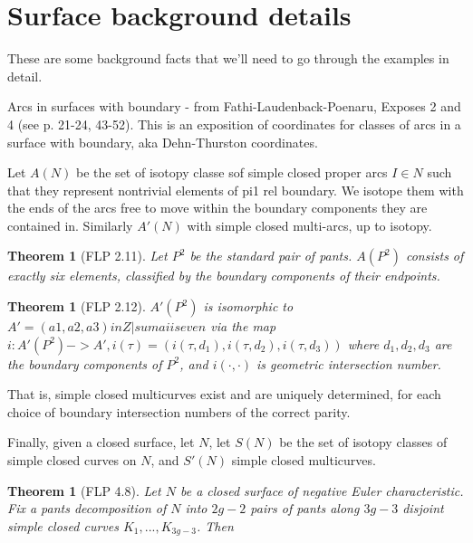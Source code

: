 \documentclass[12pt]{amsart}
\newtheorem{thm}[theorem]{Theorem}
\theoremstyle{definition}
\theoremstyle{remark}
\begin{document}
{\tiny

\section{Surface background details}

These are some background facts that we'll need to go through the examples in
detail.

Arcs in surfaces with boundary - from Fathi-Laudenback-Poenaru, Exposes 2 and
4 (see p. 21-24, 43-52).
This is an exposition of coordinates for classes of arcs in a surface
with boundary, aka Dehn-Thurston coordinates.

Let $A(N)$ be the set of isotopy classe sof simple closed proper arcs $I\in N$
such that they represent nontrivial elements of pi1 rel boundary. We isotope
them with the ends of the arcs free to move within the boundary components they
are contained in. Similarly $A'(N)$ with simple closed multi-arcs, up to
isotopy.

\begin{thm}[FLP 2.11]

Let $P^2$ be the standard pair of pants. $A(P^2)$ consists of exactly six
elements, classified by the boundary components of their endpoints.

\end{thm}

\begin{thm}[FLP 2.12]

$A'(P^2)$ is isomorphic to $A'={(a1,a2,a3) in Z | sum ai is even }$ via the map
$i:A'(P^2)->A', i(\tau) = (i(\tau, d_1),i(\tau,d_2),i(\tau,d_3))$ where
$d_1,d_2,d_3$ are the boundary components of $P^2$, and $i(\cdot,\cdot)$ is
geometric intersection number.

\end{thm}

That is, simple closed multicurves exist and are uniquely determined, for each
choice of boundary intersection numbers of the correct parity.

Finally, given a closed surface, let $N$, let $S(N)$ be the set of isotopy
classes of simple closed curves on $N$, and $S'(N)$ simple closed multicurves.

\begin{thm}[FLP 4.8]

Let $N$ be a closed surface of negative Euler characteristic.  Fix a pants
decomposition of $N$ into $2g-2$ pairs of pants along $3g-3$ disjoint simple
closed curves $K_1,...,K_{3g-3}$. Then


\end{thm}}
\end{document}
